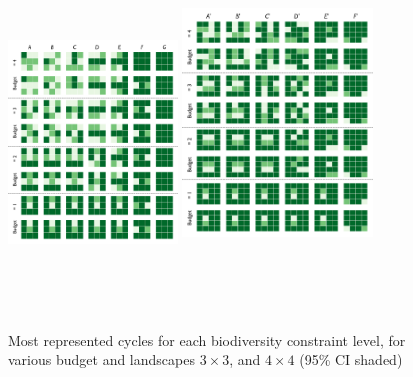 \begin{figure}[H]
    \centering
    \includegraphics[width=0.40\textwidth, height=9cm]{figures/wildland/landscapes3.png}
    \includegraphics[width=0.45\textwidth, height=10cm]{figures/wildland/landscapes4.png}
    \caption{Most represented cycles for each biodiversity constraint level, for various budget and landscapes $3 \times 3$, and $4\times 4$ (95\% CI shaded)}
    \label{fig:cycles_3_4}
\end{figure}
\newpage


